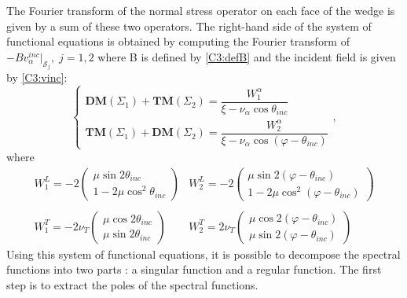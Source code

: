 The Fourier transform of the normal stress operator on each face of the wedge is given by a sum of these two operators. The right-hand side of the system of functional equations is obtained by computing the Fourier transform of $-Bv_{\alpha}^{inc}|_{\mathcal{S}_j},\; j=1,2$ where B is defined by \eqref{C3:defB} and the incident field is given by \eqref{C3:vinc}:
\begin{equation}
\left\{
\begin{matrix}
\textbf{DM}(\Sigma_1)+\textbf{TM}(\Sigma_2)=\dfrac{W_1^{\alpha}}{\xi-\nu_{\alpha} \cos \theta_{inc}} \\
\textbf{TM}(\Sigma_1)+\textbf{DM}(\Sigma_2)=\dfrac{W_2^{\alpha}}{\xi-\nu_{\alpha}\cos(\varphi-\theta_{inc})}
\end{matrix}
\right.,
\label{equationsintegrales}
\end{equation}
where
\begin{equation}
\begin{matrix}
W_1^L=-2\begin{pmatrix}
\mu \sin 2\theta_{inc}\\
1-2\mu\cos^2\theta_{inc}
\end{pmatrix}&
W_2^L=-2\begin{pmatrix}
\mu \sin 2(\varphi-\theta_{inc}) \\
1-2\mu\cos^2(\varphi-\theta_{inc})
\end{pmatrix} \\
~
\\
W_1^T=-2 \nu_T \begin{pmatrix}
\mu \cos 2\theta_{inc}\\
\mu \sin 2\theta_{inc}
\end{pmatrix}&
W_2^T=2\nu_T \begin{pmatrix}
\mu \cos 2(\varphi-\theta_{inc})\\
\mu \sin 2(\varphi-\theta_{inc})
\end{pmatrix}
\end{matrix}
\end{equation}
Using this system of functional equations, it is possible to decompose the spectral functions into two parts : a singular function and a regular function. The first step is to extract the poles of the spectral functions.
